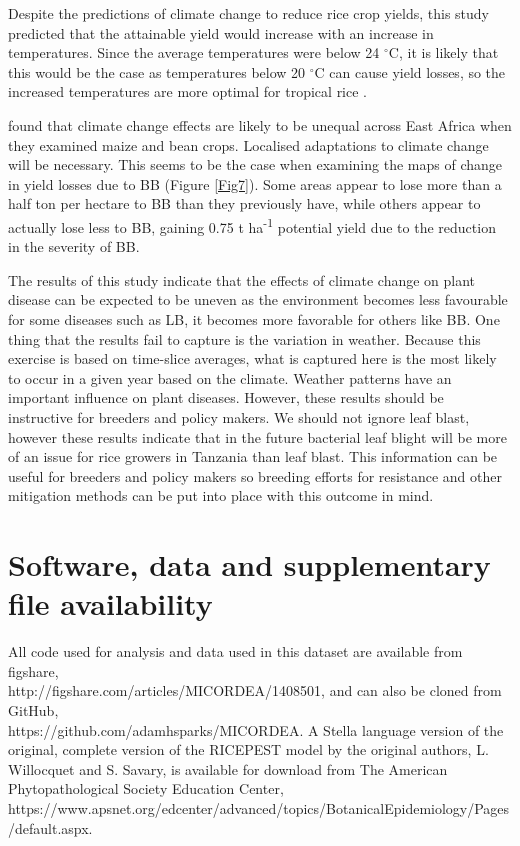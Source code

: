     Despite the predictions of climate change to reduce rice crop yields, this study predicted that the attainable yield would increase with an increase in temperatures. Since the average temperatures were below 24 $^{\circ}$C, it is likely that this would be the case as temperatures below 20 $^{\circ}$C can cause yield losses, so the increased temperatures are more optimal for tropical rice \citep{Yoshida}.
            
    \citet{Thornton2009} found that climate change effects are likely to be unequal across East Africa when they examined maize and bean crops. Localised adaptations to climate change will be necessary. This seems to be the case when examining the maps of change in yield losses due to BB (Figure \ref{Fig7}). Some areas appear to lose more than a half ton per hectare to BB than they previously have, while others appear to actually lose less to BB, gaining 0.75 t ha\textsuperscript{-1} potential yield due to the reduction in the severity of BB.
    
    The results of this study indicate that the effects of climate change on plant disease can be expected to be uneven as the environment becomes less favourable for some diseases such as LB, it becomes more favorable for others like BB. One thing that the results fail to capture is the variation in weather. Because this exercise is based on time-slice averages, what is captured here is the most likely to occur in a given year based on the climate. Weather patterns have an important influence on plant diseases. However, these results should be instructive for breeders and policy makers. We should not ignore leaf blast, however these results indicate that in the future bacterial leaf blight will be more of an issue for rice growers in Tanzania than leaf blast. This information can be useful for breeders and policy makers so breeding efforts for resistance and other mitigation methods can be put into place with this outcome in mind.
    
\section{Software, data and supplementary file availability}
\label{software_and_data_availability}
All code used for analysis and data used in this dataset are available from figshare,\\ http://figshare.com/articles/MICORDEA/1408501, and can also be cloned from GitHub,\\https://github.com/adamhsparks/MICORDEA. A Stella language version of the original, complete version of the RICEPEST model by the original authors, L. Willocquet and S. Savary, is available for download from The American Phytopathological Society Education Center,\\
https://www.apsnet.org/edcenter/advanced/topics/BotanicalEpidemiology/Pages/default.aspx.

